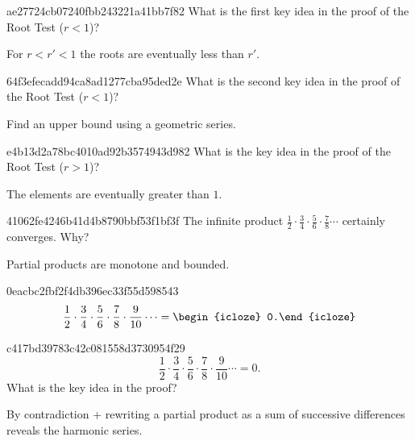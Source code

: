 \begin{note}{ae27724cb07240fbb243221a41bb7f82}
    What is the first key idea in the proof of the Root Test (\({ r < 1 }\))?

    \begin{cloze}{1}
        For \({ r < r' < 1 }\) the roots are eventually less than \({ r' }\).
    \end{cloze}
\end{note}

\begin{note}{64f3efecadd94ca8ad1277cba95ded2e}
    What is the second key idea in the proof of the Root Test (\({ r < 1 }\))?

    \begin{cloze}{1}
        Find an upper bound using a geometric series.
    \end{cloze}
\end{note}

\begin{note}{e4b13d2a78bc4010ad92b3574943d982}
    What is the key idea in the proof of the Root Test (\({ r > 1 }\))?

    \begin{cloze}{1}
        The elements are eventually greater than \({ 1 }\).
    \end{cloze}
\end{note}

\begin{note}{41062fe4246b41d4b8790bbf53f1bf3f}
    The infinite product \({ \frac{1}{2} \cdot \frac{3}{4} \cdot \frac{5}{6} \cdot \frac{7}{8} \cdots }\) certainly converges. Why?

    \begin{cloze}{1}
        Partial products are monotone and bounded.
    \end{cloze}
\end{note}

\begin{note}{0eacbc2fbf2f4db396ec33f55d598543}
    \[
        \frac{1}{2} \cdot \frac{3}{4} \cdot \frac{5}{6} \cdot \frac{7}{8} \cdot \frac{9}{10} \cdots = \begin{icloze}{1}0.\end{icloze}
    \]
\end{note}

\begin{note}{c417bd39783c42c081558d3730954f29}
    \[
        \frac{1}{2} \cdot \frac{3}{4} \cdot \frac{5}{6} \cdot \frac{7}{8} \cdot \frac{9}{10} \cdots = 0.
    \]
    What is the key idea in the proof?

    \begin{cloze}{1}
        By contradiction + rewriting a partial product as a sum of successive differences reveals the harmonic series.
    \end{cloze}
\end{note}

